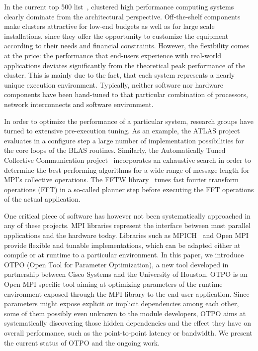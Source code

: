 In the current top 500 list~\cite{top500}, clustered high performance computing systems clearly dominate from the architectural perspective. Off-the-shelf components make clusters attractive for low-end budgets as well as for large scale installations, since they offer the opportunity to customize the equipment according to their needs and financial constraints. However, the flexibility comes at the price: the performance that end-users experience with real-world applications deviates significantly from the theoretical peak performance of the cluster. This is mainly due to the fact, that each system represents a nearly unique execution environment. Typically, neither software nor hardware components have been hand-tuned to that particular combination of processors, network interconnects and software environment. %

In order to optimize the performance of a particular system, research groups have turned to extensive pre-execution tuning. As an example, the ATLAS project~\cite{atlas} evaluates in a configure step a large number of implementation possibilities for the core loops of the BLAS routines. Similarly, the Automatically Tuned Collective Communication project~\cite{pjesa:cluster} incorporates an exhaustive search in order to determine the best performing algorithms for a wide range of message length for MPI's collective operations.  The FFTW library~\cite{fftw} tunes fast fourier transform operations (FFT) in a so-called planner step before executing the FFT operations of the actual application.

One critical piece of software has however not been systematically approached in any of these projects. MPI libraries represent the interface between most parallel applications and the hardware today. Libraries such as MPICH~\cite{Gropp:1996:HPI} and Open MPI~\cite{gabriel:ompi} provide flexible and tunable implementations, which can be adapted either at compile or at runtime to a particular environment. In this paper, we introduce OTPO (Open Tool for Parameter Optimization), a new tool developed in partnership between Cisco Systems and the University of Houston. OTPO is an Open MPI specific tool aiming at optimizing parameters of the runtime environment exposed through the MPI library to the end-user application. Since parameters might expose explicit or implicit dependencies among each other, some of them possibly even unknown to the module developers, OTPO aims at systematically discovering those hidden dependencies and the effect they have on overall performance, such as the point-to-point latency or bandwidth. We present the current status of OTPO and the ongoing work.

